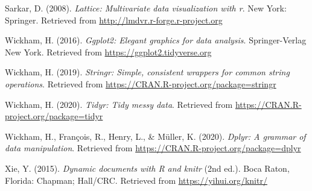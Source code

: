 \documentclass[
  english,
  man]{apa6}
\begin{document}
\leavevmode\hypertarget{ref-R-lattice}{}%
Sarkar, D. (2008). \emph{Lattice: Multivariate data visualization with r}. New York: Springer. Retrieved from \url{http://lmdvr.r-forge.r-project.org}

\leavevmode\hypertarget{ref-R-ggplot2}{}%
Wickham, H. (2016). \emph{Ggplot2: Elegant graphics for data analysis}. Springer-Verlag New York. Retrieved from \url{https://ggplot2.tidyverse.org}

\leavevmode\hypertarget{ref-R-stringr}{}%
Wickham, H. (2019). \emph{Stringr: Simple, consistent wrappers for common string operations}. Retrieved from \url{https://CRAN.R-project.org/package=stringr}

\leavevmode\hypertarget{ref-R-tidyr}{}%
Wickham, H. (2020). \emph{Tidyr: Tidy messy data}. Retrieved from \url{https://CRAN.R-project.org/package=tidyr}

\leavevmode\hypertarget{ref-R-dplyr}{}%
Wickham, H., François, R., Henry, L., \& Müller, K. (2020). \emph{Dplyr: A grammar of data manipulation}. Retrieved from \url{https://CRAN.R-project.org/package=dplyr}

\leavevmode\hypertarget{ref-R-knitr}{}%
Xie, Y. (2015). \emph{Dynamic documents with R and knitr} (2nd ed.). Boca Raton, Florida: Chapman; Hall/CRC. Retrieved from \url{https://yihui.org/knitr/}

\endgroup
\end{document}
